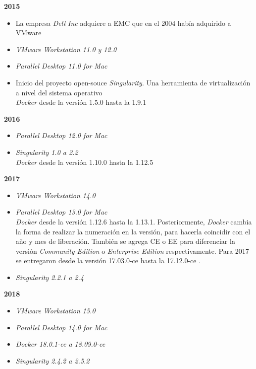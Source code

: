 \textbf{2015}\\
\begin{itemize}
	\item La empresa \textit{Dell Inc} adquiere a EMC que en el 2004 había adquirido a VMware\\
	
	\item \textit{VMware Workstation 11.0 y 12.0}\\
	
	\item \textit{Parallel Desktop 11.0 for Mac}\\	
	
	\item Inicio del proyecto open-souce \textit{Singularity}. Una herramienta de virtualización a nivel del sistema operativo\\
	
	\textit{Docker} desde la versión 1.5.0 hasta la 1.9.1\\
	
\end{itemize}


\textbf{2016}\\
\begin{itemize}
	\item \textit{Parallel Desktop 12.0 for Mac}\\	
	\item \textit{Singularity 1.0 a 2.2}\\
	
	\textit{Docker} desde la versión 1.10.0 hasta la 1.12.5\\	
\end{itemize}

\textbf{2017}\\
\begin{itemize}
	\item \textit{VMware Workstation 14.0}\\
	\item \textit{Parallel Desktop 13.0 for Mac}\\	
	
	\textit{Docker} desde la versión 1.12.6 hasta la 1.13.1. Posteriormente, \textit{Docker} cambia la forma de realizar la numeración en la versión, para hacerla coincidir con el año y mes de liberación. También se agrega CE o EE para diferenciar la versión \textit{Community Edition} o \textit{Enterprise Edition} respectivamente. Para 2017 se entregaron desde la versión 17.03.0-ce hasta la 17.12.0-ce \parencite{DockerRelease2018}.\\
	
	\item \textit{Singularity 2.2.1 a 2.4}	\\
\end{itemize}

\textbf{2018}\\
\begin{itemize}
	\item \textit{VMware Workstation 15.0}\\
	\item \textit{Parallel Desktop 14.0 for Mac}\\		
	\item \textit{Docker 18.0.1-ce a 18.09.0-ce} \\
	\item \textit{Singularity 2.4.2 a 2.5.2} \parencite{Singularity2018}\\
\end{itemize}
